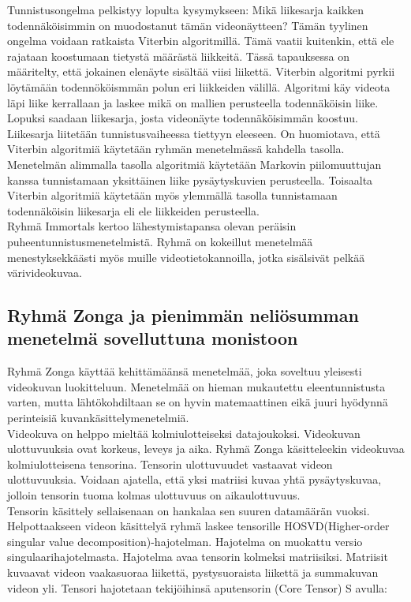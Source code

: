 Tunnistusongelma pelkistyy lopulta kysymykseen: Mikä liikesarja kaikken todennäköisimmin on muodostanut tämän videonäytteen?
Tämän tyylinen ongelma voidaan ratkaista Viterbin algoritmillä. Tämä vaatii kuitenkin, että ele rajataan koostumaan tietystä määrästä liikkeitä.
Tässä tapauksessa on määritelty, että jokainen elenäyte sisältää viisi liikettä.
Viterbin algoritmi pyrkii löytämään todennököismmän polun eri liikkeiden välillä. Algoritmi käy videota läpi liike kerrallaan ja laskee mikä
on mallien perusteella todennäköisin liike. Lopuksi saadaan liikesarja, josta videonäyte todennäköisimmän koostuu.
Liikesarja liitetään tunnistusvaiheessa tiettyyn eleeseen. On huomiotava, että Viterbin algoritmiä käytetään ryhmän menetelmässä 
kahdella tasolla. Menetelmän alimmalla tasolla algoritmiä käytetään Markovin piilomuuttujan kanssa tunnistamaan yksittäinen liike pysäytyskuvien perusteella. 
Toisaalta Viterbin algoritmiä käytetään myös ylemmällä tasolla tunnistamaan todennäköisin liikesarja eli ele liikkeiden perusteella. \citep {6239185}\\

Ryhmä Immortals kertoo lähestymistapansa olevan peräisin puheentunnistusmenetelmistä. Ryhmä on kokeillut menetelmää menestyksekkäästi myös muille videotietokannoilla,
jotka sisälsivät pelkää värivideokuvaa. \citep{firstround}\\


\subsection{Ryhmä Zonga ja pienimmän neliösumman menetelmä sovelluttuna monistoon}
Ryhmä Zonga käyttää kehittämäänsä menetelmää, joka soveltuu yleisesti videokuvan luokitteluun. 
Menetelmää on hieman mukautettu eleentunnistusta varten, mutta lähtökohdiltaan se on hyvin 
matemaattinen eikä juuri hyödynnä perinteisiä kuvankäsittelymenetelmiä. \citep {6239180}\\

Videokuva on helppo mieltää kolmiulotteiseksi datajoukoksi. Videokuvan ulottuvuuksia ovat korkeus, leveys ja aika.
Ryhmä Zonga käsitteleekin videokuvaa kolmiulotteisena tensorina. Tensorin ulottuvuudet vastaavat videon ulottuvuuksia.
Voidaan ajatella, että yksi matriisi kuvaa yhtä pysäytyskuvaa, jolloin tensorin tuoma kolmas ulottuvuus on aikaulottuvuus. \citep {6239180}\\

Tensorin käsittely sellaisenaan on hankalaa sen suuren datamäärän vuoksi. Helpottaakseen videon käsittelyä
ryhmä laskee tensorille HOSVD(Higher-order singular value decomposition)-hajotelman. Hajotelma on muokattu versio
singulaarihajotelmasta. Hajotelma avaa tensorin kolmeksi matriisiksi.
Matriisit kuvaavat videon vaakasuoraa liikettä, pystysuoraista liikettä ja summakuvan videon yli. \citep {HOSVD} 
Tensori hajotetaan tekijöihinsä aputensorin (Core Tensor) S avulla:

